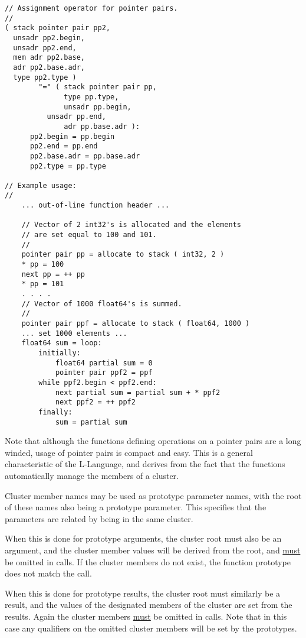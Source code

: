 \documentclass[12pt]{article}
\newenvironment{indpar}[1][0.3in]%
	{\begin{list}{}%
		     {\setlength{\itemsep}{0in}%
		      \setlength{\topsep}{0in}%
		      \setlength{\parsep}{1ex}%
		      \setlength{\labelwidth}{#1}%
		      \setlength{\leftmargin}{#1}%
		      \addtolength{\leftmargin}{\labelsep}}%
	 \item}%
	{\end{list}}
\begin{document}
\begin{indpar}
\begin{verbatim}
// Assignment operator for pointer pairs.
//
( stack pointer pair pp2,
  unsadr pp2.begin,
  unsadr pp2.end,
  mem adr pp2.base,
  adr pp2.base.adr,
  type pp2.type )
        "=" ( stack pointer pair pp,
              type pp.type,
              unsadr pp.begin,
	      unsadr pp.end,
              adr pp.base.adr ):
      pp2.begin = pp.begin
      pp2.end = pp.end
      pp2.base.adr = pp.base.adr
      pp2.type = pp.type

// Example usage:
//
    ... out-of-line function header ...

    // Vector of 2 int32's is allocated and the elements
    // are set equal to 100 and 101.
    //
    pointer pair pp = allocate to stack ( int32, 2 )
    * pp = 100
    next pp = ++ pp
    * pp = 101
    . . . .
    // Vector of 1000 float64's is summed.
    //
    pointer pair ppf = allocate to stack ( float64, 1000 )
    ... set 1000 elements ...
    float64 sum = loop:
        initially:
            float64 partial sum = 0
            pointer pair ppf2 = ppf
        while ppf2.begin < ppf2.end:
            next partial sum = partial sum + * ppf2
            next ppf2 = ++ ppf2
        finally:
            sum = partial sum
\end{verbatim}\end{indpar}

Note that although the functions defining operations on a pointer pairs
are a long winded, usage of pointer pairs is compact and easy.
This is a general characteristic of the L-Language, and derives
from the fact that the functions automatically manage the members
of a cluster.

Cluster member names may be used as prototype parameter
names, with the root of these names also being a prototype
parameter.  This specifies that the parameters are related
by being in the same cluster.

When this is done for prototype arguments, the cluster root must
also be an argument, and the cluster member values
will be derived from the root, and \underline{must}
be omitted in calls.  If the cluster members do not exist,
the function prototype does not match the call.

When this is done for prototype results, the cluster root must similarly
be a result, and the values of the designated
members of the cluster are set from the results.
Again the cluster members \underline{must} be omitted in calls.
Note that in this case any qualifiers on the omitted cluster
members will be set by the prototypes.
\end{document}
